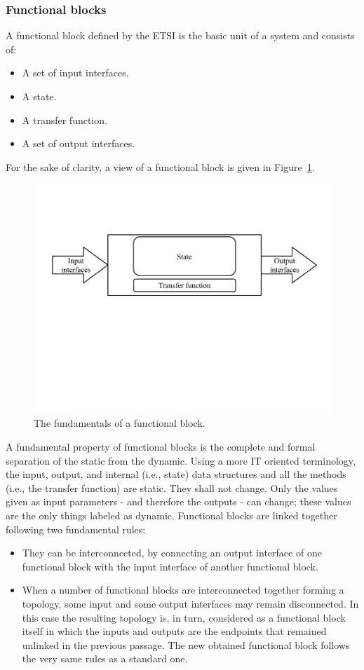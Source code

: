 \subsubsection{Functional blocks}
A functional block defined by the ETSI is the basic unit of a system and consists of:
\begin{itemize}
	\item A set of input interfaces.
	\item A state.
	\item A transfer function.
	\item A set of output interfaces.
\end{itemize}
For the sake of clarity, a view of a functional block is given in Figure~\ref{fig:functional_block}.
\begin{figure}[h]
	\centering
	\includegraphics[clip= true, width= \columnwidth, trim=0cm  10cm 0cm 4cm]{images/functional_block.pdf}
	\caption{The fundamentals of a functional block.}
	\label{fig:functional_block}
\end{figure}
A fundamental property of functional blocks is the complete and formal separation of the static from the dynamic. Using a more IT oriented terminology, the input, output, and internal (i.e., state) data structures and all the methods (i.e., the transfer function) are static. They shall not change. Only the values given as input parameters - and therefore the outputs - can change; these values are the only things labeled as dynamic.
Functional blocks are linked together following two fundamental rules:
\begin{itemize}
	\item They can be interconnected, by connecting an output interface of one functional block with the input interface of another functional block.
	\item When a number of functional blocks are interconnected together forming a topology, some input and some output interfaces may remain disconnected. In this case the resulting topology is, in turn, considered as a functional block itself in which the inputs and outputs are the endpoints that remained unlinked in the previous passage. The new obtained functional block follows the very same rules as a standard one.
\end{itemize}

